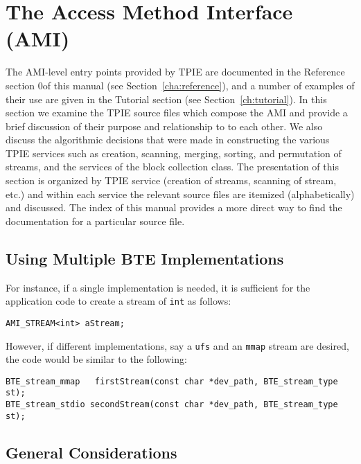 


\section{The Access Method Interface (AMI)}

The AMI-level entry points provided by TPIE are documented
in the Reference section 0of this manual (see
Section~\ref{cha:reference}), and a number of examples of
their use are given in the Tutorial section (see
Section~\ref{ch:tutorial}).  In this section we examine the
TPIE source files which compose the AMI and provide a brief
discussion of their purpose and relationship to to each
other. We also discuss the algorithmic decisions that were
made in constructing the various TPIE services such as
creation, scanning, merging, sorting, and permutation of
streams, and the services of the block collection class. The
presentation of this section is organized by TPIE service
(creation of streams, scanning of stream, etc.) and within
each service the relevant source files are itemized
(alphabetically) and discussed. The index of this manual
provides a more direct way to find the documentation for a
particular source file.

\subsection{Using Multiple BTE Implementations}


For instance, if a single implementation is needed, it is
sufficient for the application code to create a stream of
\lstinline|int| as follows:
\begin{lstlisting}
AMI_STREAM<int> aStream;
\end{lstlisting}
However, if different implementations, say a \lstinline|ufs| and
an \lstinline|mmap| stream are desired, the code would be similar
to the following:
\begin{lstlisting}
BTE_stream_mmap   firstStream(const char *dev_path, BTE_stream_type st);
BTE_stream_stdio secondStream(const char *dev_path, BTE_stream_type st);
\end{lstlisting}

\subsection{General Considerations}

